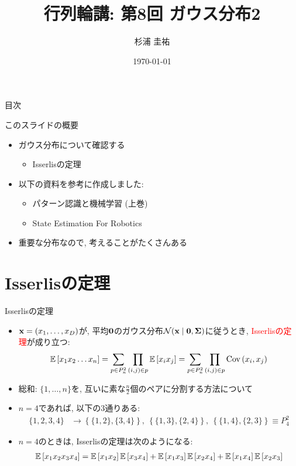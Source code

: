 \documentclass[dvipdfmx,notheorems,t]{beamer}
\title{行列輪講: 第8回 ガウス分布2}
\author{杉浦 圭祐}
\institute[松谷研究室]{慶應義塾大学理工学部情報工学科 松谷研究室}
\date{\today}
\begin{document}
\linespread{1.1}

\frame{\titlepage}

\section{}

\begin{frame}{目次}
\tableofcontents
\end{frame}

\begin{frame}{このスライドの概要}
\begin{itemize}
  \item ガウス分布について確認する
  \begin{itemize}
    \item Isserlisの定理
  \end{itemize}
  \item 以下の資料を参考に作成しました:
  \begin{itemize}
    \item パターン認識と機械学習 (上巻)
    \item State Estimation For Robotics
  \end{itemize}
  \item 重要な分布なので, 考えることがたくさんある
\end{itemize}
\end{frame}

\section{Isserlisの定理}

\begin{frame}{Isserlisの定理}
\begin{itemize}
  \item $\vb{x} = (x_1, \ldots, x_D)$が, 平均$\vb{0}$のガウス分布$\mathcal{N}(\vb{x} \mid \vb{0}, \vb{\Sigma})$に従うとき,
  \textcolor{red}{Isserlisの定理}が成り立つ:
  \begin{align*}
    \operatorname{\mathbb{E}} \left[ x_1 x_2 \ldots x_n \right] = \sum_{p \in P_n^2} \prod_{(i, j) \in p} \operatorname{\mathbb{E}} \left[ x_i x_j \right]
      = \sum_{p \in P_n^2} \prod_{(i, j) \in p} \operatorname{Cov} \left( x_i, x_j \right)
  \end{align*}
  \item 総和: $\{ 1, \ldots, n \}$を, 互いに素な$\frac{n}{2}$個のペアに分割する方法について
  \item $n = 4$であれば, 以下の3通りある:
  \begin{align*}
    \{ 1, 2, 3, 4 \} &\to \left\{ \{ 1, 2 \}, \{ 3, 4 \} \right\}, \
      \left\{ \{ 1, 3 \}, \{ 2, 4 \} \right\}, \
      \left\{ \{ 1, 4 \}, \{ 2, 3 \} \right\} \equiv P_4^2
  \end{align*}
  \item $n = 4$のときは, Isserlisの定理は次のようになる:
  \begin{align*}
    \operatorname{\mathbb{E}} \left[ x_1 x_2 x_3 x_4 \right] = \operatorname{\mathbb{E}} \left[ x_1 x_2 \right] \operatorname{\mathbb{E}} \left[ x_3 x_4 \right]
      + \operatorname{\mathbb{E}} \left[ x_1 x_3 \right] \operatorname{\mathbb{E}} \left[ x_2 x_4 \right] + \operatorname{\mathbb{E}} \left[ x_1 x_4 \right] \operatorname{\mathbb{E}} \left[ x_2 x_3 \right]
  \end{align*}
\end{itemize}
\end{frame}
\end{document}
